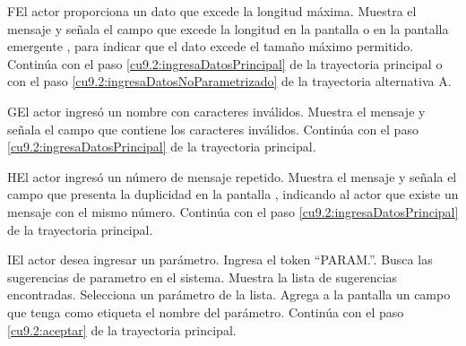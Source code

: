  \begin{UCtrayectoriaA}{F}{El actor proporciona un dato que excede la longitud máxima.}
    \UCpaso[\UCsist] Muestra el mensaje  y señala el campo que excede la 
    longitud en la pantalla  o en la pantalla emergente , para indicar que el dato excede el tamaño máximo permitido.
    \UCpaso[] Continúa con el paso \ref{cu9.2:ingresaDatosPrincipal} de la trayectoria principal o con el paso \ref{cu9.2:ingresaDatosNoParametrizado} de la trayectoria alternativa A.
 \end{UCtrayectoriaA}
 
 \begin{UCtrayectoriaA}{G}{El actor ingresó un nombre con caracteres inválidos.}
    \UCpaso[\UCsist] Muestra el mensaje  y señala el campo que contiene los caracteres inválidos.
    \UCpaso[] Continúa con el paso \ref{cu9.2:ingresaDatosPrincipal} de la trayectoria principal.
 \end{UCtrayectoriaA}
 \begin{UCtrayectoriaA}{H}{El actor ingresó un número de mensaje repetido.}
    \UCpaso[\UCsist] Muestra el mensaje  y señala el campo que presenta la duplicidad en la pantalla 
	    , indicando al actor que existe un mensaje con el mismo número.
    \UCpaso[] Continúa con el paso \ref{cu9.2:ingresaDatosPrincipal} de la trayectoria principal.
 \end{UCtrayectoriaA}
 
 \begin{UCtrayectoriaA}{I}{El actor desea ingresar un parámetro.}
 	 \UCpaso[\UCactor] Ingresa el token ``PARAM.''.
 	\UCpaso[\UCsist] Busca las sugerencias de parametro en el sistema. 
 	\UCpaso[\UCsist] Muestra la lista de sugerencias encontradas.
 	\UCpaso[\UCactor] Selecciona un parámetro de la lista.
  	\UCpaso[\UCsist] Agrega a la pantalla un campo que tenga como etiqueta el nombre del parámetro. 
    \UCpaso[] Continúa con el paso \ref{cu9.2:aceptar} de la trayectoria principal.
 \end{UCtrayectoriaA}
 
